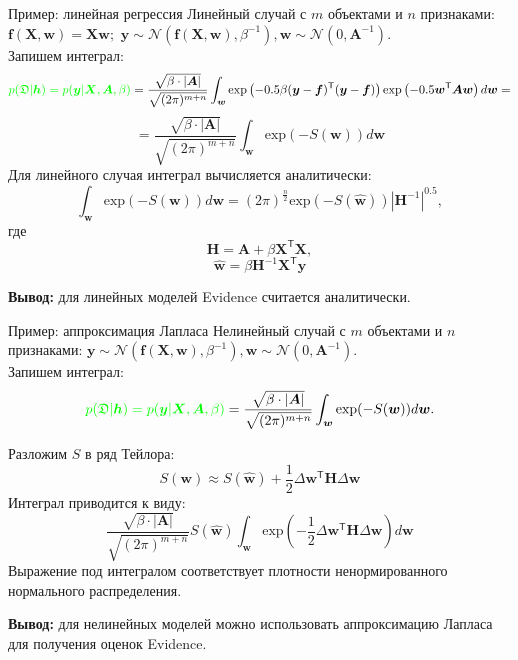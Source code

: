 \documentclass[9pt,pdf,utf8,hyperref={unicode},aspectratio=169]{beamer}
\begin{document}
\begin{frame}{Пример: линейная регрессия}
\small
Линейный случай с $m$ объектами и $n$ признаками:
$\boldsymbol{f}(\boldsymbol{X}, \boldsymbol{w}) = \boldsymbol{X}\boldsymbol{w};$
$\boldsymbol{y} \sim \mathcal{N}(\boldsymbol{f}(\boldsymbol{X}, \boldsymbol{w}), \beta^{-1}), \boldsymbol{w} \sim \mathcal{N}(0, \boldsymbol{A}^{-1}).$\\
Запишем интеграл:
$$\textcolor{green}{p(\mathfrak{D}|\boldsymbol{h}) = p(\boldsymbol{y}|\boldsymbol{X}, \boldsymbol{A}, \beta)} = \frac{\sqrt{\beta \cdot |\boldsymbol{A}|}}{\sqrt{(2\pi)^{m+n}}}\int_{\boldsymbol{w}} \text{exp}\left(-0.5 \beta (\boldsymbol{y}-\boldsymbol{f})^\mathsf{T}(\boldsymbol{y}-\boldsymbol{f}) \right) \text{exp}\left(-0.5  \boldsymbol{w}^\mathsf{T}\boldsymbol{A}\boldsymbol{w} \right)d\boldsymbol{w} = $$
$$ = \frac{\sqrt{\beta \cdot |\boldsymbol{A}|}}{\sqrt{(2\pi)^{m+n}}}\int_{\boldsymbol{w}} \text{exp}(-S(\boldsymbol{w}))d\boldsymbol{w}$$
Для линейного случая интеграл вычисляется аналитически:
$$\int_{\boldsymbol{w}} \text{exp}(-S(\boldsymbol{w}))d\boldsymbol{w} = (2\pi)^\frac{n}{2} \text{exp}(-S(\hat{\boldsymbol{w}})) |\boldsymbol{H}^{-1}|^{0.5},$$
где 
$$\boldsymbol{H} = \boldsymbol{A} + \beta\boldsymbol{X}^\mathsf{T}\boldsymbol{X},$$
$$\hat{\boldsymbol{w}} = \beta\boldsymbol{H}^{-1}\boldsymbol{X}^\mathsf{T}\boldsymbol{y}$$

\textbf{Вывод:} для линейных моделей Evidence считается аналитически.

\end{frame}


\begin{frame}{Пример: аппроксимация Лапласа}
\small
Нелинейный случай с $m$ объектами и $n$ признаками:
$\boldsymbol{y} \sim \mathcal{N}(\boldsymbol{f}(\boldsymbol{X}, \boldsymbol{w}), \beta^{-1}), \boldsymbol{w} \sim \mathcal{N}(0, \boldsymbol{A}^{-1}).$\\
Запишем интеграл:
$$\textcolor{green}{p(\mathfrak{D}|\boldsymbol{h}) = p(\boldsymbol{y}|\boldsymbol{X}, \boldsymbol{A}, \beta) }=  \frac{\sqrt{\beta \cdot |\boldsymbol{A}|}}{\sqrt{(2\pi)^{m+n}}}\int_{\boldsymbol{w}} \text{exp}(-S(\boldsymbol{w}))d\boldsymbol{w}.$$

Разложим $S$ в ряд Тейлора:
$$S(\boldsymbol{w}) \approx S(\hat{\boldsymbol{w}}) +\frac{1}{2}\Delta\boldsymbol{w}^\mathsf{T}\boldsymbol{H}\Delta\boldsymbol{w}$$
Интеграл приводится к виду:
$$\frac{\sqrt{\beta \cdot |\boldsymbol{A}|}}{\sqrt{(2\pi)^{m+n}}} S(\hat{\boldsymbol{w}}) \int_{\boldsymbol{w}} \text{exp}(-\frac{1}{2}\Delta\boldsymbol{w}^\mathsf{T}\boldsymbol{H}\Delta\boldsymbol{w})d\boldsymbol{w} $$
Выражение под интегралом соответствует плотности ненормированного нормального распределения.

\textbf{Вывод:} для нелинейных моделей можно использовать аппроксимацию Лапласа для получения оценок Evidence.


\end{frame}
\end{document}
